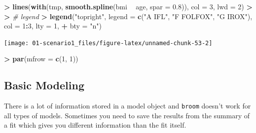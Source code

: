 \documentclass[
]{book}
\newenvironment{Shaded}{\begin{snugshade}}{\end{snugshade}}
\newcommand{\CommentTok}[1]{\textcolor[rgb]{0.56,0.35,0.01}{\textit{#1}}}
\newcommand{\DataTypeTok}[1]{\textcolor[rgb]{0.13,0.29,0.53}{#1}}
\newcommand{\DecValTok}[1]{\textcolor[rgb]{0.00,0.00,0.81}{#1}}
\newcommand{\ErrorTok}[1]{\textcolor[rgb]{0.64,0.00,0.00}{\textbf{#1}}}
\newcommand{\FloatTok}[1]{\textcolor[rgb]{0.00,0.00,0.81}{#1}}
\newcommand{\KeywordTok}[1]{\textcolor[rgb]{0.13,0.29,0.53}{\textbf{#1}}}
\newcommand{\NormalTok}[1]{#1}
\newcommand{\OperatorTok}[1]{\textcolor[rgb]{0.81,0.36,0.00}{\textbf{#1}}}
\newcommand{\StringTok}[1]{\textcolor[rgb]{0.31,0.60,0.02}{#1}}
\begin{document}
\begin{Shaded}
\begin{Highlighting}[]
\OperatorTok{>}\StringTok{ }\KeywordTok{lines}\NormalTok{(}\KeywordTok{with}\NormalTok{(tmp, }\KeywordTok{smooth.spline}\NormalTok{(bmi }\OperatorTok{~}\StringTok{ }\NormalTok{age, }\DataTypeTok{spar =} \FloatTok{0.8}\NormalTok{)), }\DataTypeTok{col =} \DecValTok{3}\NormalTok{, }\DataTypeTok{lwd =} \DecValTok{2}\NormalTok{)}
\OperatorTok{>}\StringTok{ }
\ErrorTok{>}\StringTok{ }\CommentTok{# legend}
\ErrorTok{>}\StringTok{ }\KeywordTok{legend}\NormalTok{(}\StringTok{"topright"}\NormalTok{, }\DataTypeTok{legend =} \KeywordTok{c}\NormalTok{(}\StringTok{"A IFL"}\NormalTok{, }\StringTok{"F FOLFOX"}\NormalTok{, }\StringTok{"G IROX"}\NormalTok{), }\DataTypeTok{col =} \DecValTok{1}\OperatorTok{:}\DecValTok{3}\NormalTok{, }\DataTypeTok{lty =} \DecValTok{1}\NormalTok{, }
\OperatorTok{+}\StringTok{     }\DataTypeTok{bty =} \StringTok{"n"}\NormalTok{)}
\end{Highlighting}
\end{Shaded}

\begin{center}\texttt{[image: 01-scenario1\_files/figure-latex/unnamed-chunk-53-2]} \end{center}

\begin{Shaded}
\begin{Highlighting}[]
\OperatorTok{>}\StringTok{ }\KeywordTok{par}\NormalTok{(}\DataTypeTok{mfrow =} \KeywordTok{c}\NormalTok{(}\DecValTok{1}\NormalTok{, }\DecValTok{1}\NormalTok{))}
\end{Highlighting}
\end{Shaded}

\hypertarget{alt-model}{%
\subsection{Basic Modeling}\label{alt-model}}

There is a lot of information stored in a model object and \texttt{broom} doesn't work for all types of models. Sometimes you need to save the results from the summary of a fit which gives you different information than the fit itself.
\end{document}
